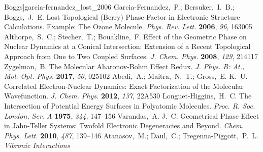 \documentclass[superscriptaddress,showpacs,amsmath,amssymb,pra,twocolumn]{revtex4-1}
\begin{document}
\begin{thebibliography}{61}
  Boggs]{garcia-fernandez_lost_2006}
Garcia-Fernandez,~P.; Bersuker,~I.~B.; Boggs,~J.~E. Lost {{Topological}}
  ({{Berry}}) {{Phase Factor}} in {{Electronic Structure Calculations}}.
  {{Example}}: {{The Ozone Molecule}}. \emph{Phys. Rev. Lett.}
  \textbf{2006}, \emph{96}, 163005\relax
\mciteBstWouldAddEndPuncttrue
\mciteSetBstMidEndSepPunct{\mcitedefaultmidpunct}
{\mcitedefaultendpunct}{\mcitedefaultseppunct}\relax
\EndOfBibitem
{}
Althorpe,~S.~C.; Stecher,~T.; Bouakline,~F. Effect of the Geometric Phase on
  Nuclear Dynamics at a Conical Intersection: {{Extension}} of a Recent
  Topological Approach from One to Two Coupled Surfaces. \emph{J. Chem. Phys.} \textbf{2008}, \emph{129}, 214117\relax
\mciteBstWouldAddEndPuncttrue
\mciteSetBstMidEndSepPunct{\mcitedefaultmidpunct}
{\mcitedefaultendpunct}{\mcitedefaultseppunct}\relax
\EndOfBibitem
{}
Zygelman,~B. The Molecular Aharonov-Bohm Effect Redux. \emph{J. Phys. B: At., Mol. Opt. Phys.} \textbf{2017},
  \emph{50}, 025102\relax
\mciteBstWouldAddEndPuncttrue
\mciteSetBstMidEndSepPunct{\mcitedefaultmidpunct}
{\mcitedefaultendpunct}{\mcitedefaultseppunct}\relax
\EndOfBibitem
{}
Abedi,~A.; Maitra,~N.~T.; Gross,~E. K.~U. Correlated Electron-Nuclear Dynamics:
  {{Exact}} Factorization of the Molecular Wavefunction. \emph{J. Chem. Phys.} \textbf{2012}, \emph{137}, 22A530\relax
\mciteBstWouldAddEndPuncttrue
\mciteSetBstMidEndSepPunct{\mcitedefaultmidpunct}
{\mcitedefaultendpunct}{\mcitedefaultseppunct}\relax
\EndOfBibitem
{}
Longuet-Higgins,~H.~C. The {{Intersection}} of {{Potential Energy Surfaces}} in
  {{Polyatomic Molecules}}. \emph{Proc. R. Soc. London, Ser. A} \textbf{1975}, \emph{344},
  147--156\relax
\mciteBstWouldAddEndPuncttrue
\mciteSetBstMidEndSepPunct{\mcitedefaultmidpunct}
{\mcitedefaultendpunct}{\mcitedefaultseppunct}\relax
\EndOfBibitem
{}
Varandas,~A. J.~C. Geometrical Phase Effect in Jahn-Teller Systems:
  {{Twofold}} Electronic Degeneracies and Beyond. \emph{Chem. Phys.
  Lett.} \textbf{2010}, \emph{487}, 139--146\relax
\mciteBstWouldAddEndPuncttrue
\mciteSetBstMidEndSepPunct{\mcitedefaultmidpunct}
{\mcitedefaultendpunct}{\mcitedefaultseppunct}\relax
\EndOfBibitem
{}
Atanasov,~M.; Daul,~C.; Tregenna-Piggott,~P.~L. \emph{Vibronic {{Interactions}}
}
\end{thebibliography}
\end{document}
